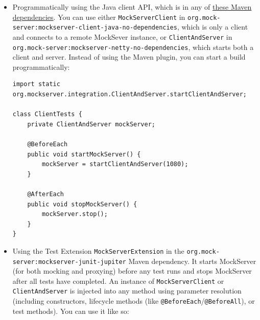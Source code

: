 \documentclass[table, xcdraw]{article}%
\begin{document}
\begin{itemize}
    Note that, if you use the \texttt{runForked} goal and the test phase fails, MockServer will not be stopped as Maven does not run any more phases after a phase has failed, so use the use the \texttt{start} and \texttt{stop} goals if you want to ensure MockServer is stopped even when there are test failures (these run MockServer on a separate thread that is stopped however maven exits). Alternatively, a \texttt{TestListener} can be used with \texttt{maven-surefire-plugin} to ensure that MockServer is stopped even when a test fails, as follows:
    
    \begin{verbatim}
<plugin>
    <groupId>org.apache.maven.plugins</groupId>
    <artifactId>maven-surefire-plugin</artifactId>
    <version>2.17</version>
    <configuration>
        <properties>
            <property>
                <name>listener</name>
                <value>org.mockserver.maven.StopMockServerTestListener</value>
            </property>
        </properties>
    </configuration>
</plugin>
    \end{verbatim}
    \item Programmatically using the Java client API, which is in any of \href{https://www.mock-server.com/where/maven_central.html#mockserver_netty}{these Maven dependencies}. You can use either \texttt{MockServerClient} in \texttt{org.mock-server:mockserver-client-java-no-dependencies}, which is only a client and connects to a remote MockSever instance, or \texttt{ClientAndServer} in \texttt{org.mock-server:mockserver-netty-no-dependencies}, which starts both a client and server. Instead of using the Maven plugin, you can start a build programmatically:
    
    \begin{verbatim}
import static org.mockserver.integration.ClientAndServer.startClientAndServer;

class ClientTests {
    private ClientAndServer mockServer;
    
    @BeforeEach
    public void startMockServer() {
        mockServer = startClientAndServer(1080);
    }

    @AfterEach
    public void stopMockServer() {
        mockServer.stop();
    }
}
    \end{verbatim}
    \item Using the Test Extension \texttt{MockServerExtension} in the \texttt{org.mock-server:mockserver-junit-jupiter} Maven dependency. It starts MockServer (for both mocking and proxying) before any test runs and stops MockServer after all tests have completed. An instance of \texttt{MockServerClient} or \texttt{ClientAndServer} is injected into any method using parameter resolution (including constructors, lifecycle methods (like \texttt{@BeforeEach}/\texttt{@BeforeAll}), or test methods). You can use it like so:


\end{itemize}
\end{document}
